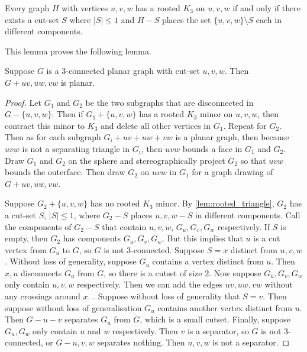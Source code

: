 \begin{lemma}\label{lem:rooted_triangle}
	Every graph $H$ with vertices $u, v, w$ has a rooted $K_3$ on $u, v, w$ if and only if there exists a cut-set $S$ where $|S| \leq 1$ and $H - S$ places the set $\{u,v,w\} \setminus S$ each in different components. 
\end{lemma}

This lemma proves the following lemma.

\begin{lemma}\label{thm:cutset_added_edges}
	Suppose $G$ is a $3$-connected planar graph with cut-set $u,v,w$. Then $G + uv, uw, vw$ is planar. 
\end{lemma}

\begin{proof}
	Let $G_1$ and $G_2$ be the two subgraphs that are disconnected in $G - \{u,v,w\}$. Then if $G_1 + \{u,v,w\}$ has a rooted $K_3$ minor on $u,v,w$, then contract this minor to $K_3$ and delete all other vertices in $G_1$. Repeat for $G_2$. Then as for each subgraph $G_i + uv + uw + vw$ is a planar graph, then because $uvw$ is not a separating triangle in $G_i$, then $uvw$ bounds a face in $G_1$ and $G_2$. Draw $G_1$ and $G_2$ on the sphere and stereographically project $G_2$ so that $uvw$ bounds the outerface. Then draw $G_2$ on $uvw$ in $G_1$ for a graph drawing of $G + uv, uw, vw$. 
	
	Suppose $G_2 + \{u,v,w\}$ has no rooted $K_3$ minor. By \cref{lem:rooted_triangle}, $G_2$ has a cut-set $S$, $|S| \leq 1$, where $G_2 - S$ places $u,v,w - S$ in different components. Call the components of $G_2 - S$ that contain $u,v,w$, $G_u, G_v, G_w$ respectively. If $S$ is empty, then $G_2$ has components $G_u, G_v, G_w$. But this implies that $u$ is a cut vertex from $G_u$ to $G$, so $G$ is not $3$-connected. Suppose $S = x$ distinct from $u,v,w$. Without loss of generality, suppose $G_u$ contains a vertex distinct from $u$. Then $x, u$ disconnects $G_u$ from $G$, so there is a cutset of size 2. Now suppose $G_u, G_v, G_w$ only contain $u,v,w$ respectively. Then we can add the edges $uv, uw, vw$ without any crossings around $x$. . Suppose without loss of generality that $S = v$. Then suppose without loss of generalisation $G_u$ contains another vertex distinct from $u$. Then $G - u - v$ separates $G_u$ from $G$, which is a small cutset. Finally, suppose $G_u, G_w$ only contain $u$ and $w$ respectively. Then $v$ is a separator, so $G$ is not $3$-connected, or $G - u,v,w$ separates nothing. Then $u,v,w$ is not a separator. 
\end{proof}

